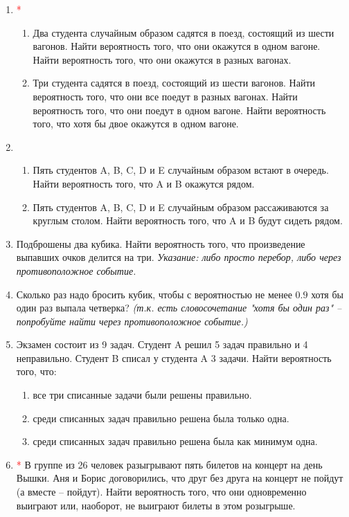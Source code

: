 \documentclass{article}
\begin{document}
\begin{enumerate}
    \item \textcolor{red}{*}
    \begin{enumerate}
        \item Два студента случайным образом садятся в поезд, состоящий из шести вагонов. Найти вероятность того, что они окажутся в одном вагоне. Найти вероятность того, что они окажутся в разных вагонах.
        \item Три студента садятся в поезд, состоящий из шести вагонов. Найти вероятность того, что они все поедут в разных вагонах. Найти вероятность того, что они поедут в одном вагоне. Найти вероятность того, что хотя бы двое окажутся в одном вагоне.
    \end{enumerate}

    \item 
    \begin{enumerate}
        \item Пять студентов A, B, C, D и E случайным образом встают в очередь. Найти вероятность того, что A и B окажутся рядом.
        \item Пять студентов A, B, C, D и E случайным образом рассаживаются за круглым столом. Найти вероятность того, что A и B будут сидеть рядом.
    \end{enumerate}

    \item Подброшены два кубика. Найти вероятность того, что произведение выпавших очков делится на три.
    \textit{Указание: либо просто перебор, либо через противоположное событие.}

    \item Сколько раз надо бросить кубик, чтобы с вероятностью не менее $0.9$ хотя бы один раз выпала четверка? \textit{(т.к. есть словосочетание "хотя бы один раз" – попробуйте найти через противоположное событие.)}

    \item Экзамен состоит из 9 задач. Студент A решил 5 задач правильно и 4 неправильно. Студент B списал у студента A 3 задачи. Найти вероятность того, что:
    \begin{enumerate}
        \item все три списанные задачи были решены правильно.
        \item среди списанных задач правильно решена была только одна.
        \item среди списанных задач правильно решена была как минимум одна.
    \end{enumerate}

    \item \textcolor{red}{*} В группе из 26 человек разыгрывают пять билетов на концерт на день Вышки. Аня и Борис договорились, что друг без друга на концерт не пойдут (а вместе -- пойдут). Найти вероятность того, что они одновременно выиграют или, наоборот, не выиграют билеты в этом розыгрыше.


\end{enumerate}
\end{document}
